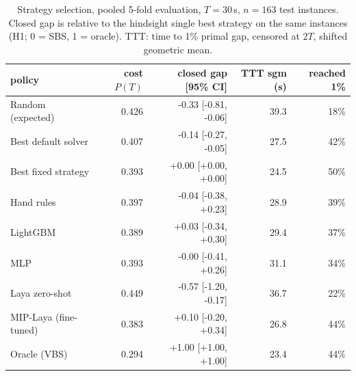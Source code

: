 \begin{table}[t]\centering\small
\begin{tabular}{lrrrr}
\toprule
policy & cost $P(T)$ & closed gap [95\% CI] & TTT sgm (s) & reached 1\% \\
\midrule
Random (expected) & 0.426 & -0.33 [-0.81, -0.06] & 39.3 & 18\% \\
Best default solver & 0.407 & -0.14 [-0.27, -0.05] & 27.5 & 42\% \\
Best fixed strategy & 0.393 & +0.00 [+0.00, +0.00] & 24.5 & 50\% \\
Hand rules & 0.397 & -0.04 [-0.38, +0.23] & 28.9 & 39\% \\
LightGBM & 0.389 & +0.03 [-0.34, +0.30] & 29.4 & 37\% \\
MLP & 0.393 & -0.00 [-0.41, +0.26] & 31.1 & 34\% \\
Laya zero-shot & 0.449 & -0.57 [-1.20, -0.17] & 36.7 & 22\% \\
MIP-Laya (fine-tuned) & 0.383 & +0.10 [-0.20, +0.34] & 26.8 & 44\% \\
Oracle (VBS) & 0.294 & +1.00 [+1.00, +1.00] & 23.4 & 44\% \\
\bottomrule
\end{tabular}
\caption{Strategy selection, pooled 5-fold evaluation, $T=30$\,s, $n=163$ test instances. Closed gap is relative to the hindsight single best strategy on the same instances (H1; 0 = SBS, 1 = oracle). TTT: time to 1\% primal gap, censored at $2T$, shifted geometric mean.}\label{tab:sel-pooled-30}
\end{table}